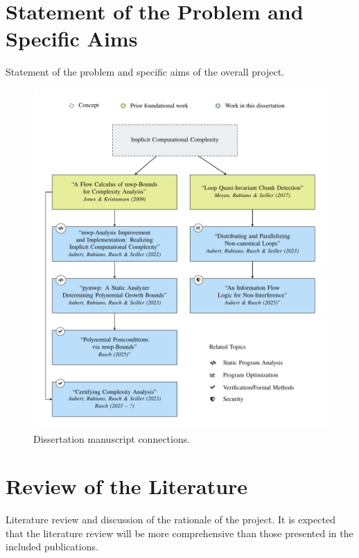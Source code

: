\clearpage\section{Statement of the Problem and Specific Aims}\label{intro}

Statement of the problem and specific aims of the overall project.


\begin{figure}[p]
\centering
\includegraphics[width=\linewidth,height=\textheight,keepaspectratio]{pdf/fig_conn_papers}
\caption{Dissertation manuscript connections.}\label{fig:conn_papers}
\end{figure}


\clearpage\section{Review of the Literature}\label{sec:pre}

Literature review and discussion of the rationale of the project.
It is expected that the literature review will be more comprehensive than
those presented in the included publications.
